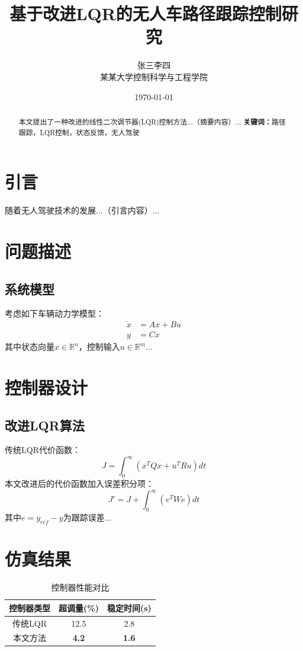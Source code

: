\documentclass[a4paper,10pt,twocolumn]{article}
\title{基于改进LQR的无人车路径跟踪控制研究}
\author{张三\quad 李四\\
        某某大学控制科学与工程学院}
\date{\today}
\begin{document}
\maketitle  %

\begin{abstract}
本文提出了一种改进的线性二次调节器(LQR)控制方法...（摘要内容）...
\textbf{关键词：}路径跟踪，LQR控制，状态反馈，无人驾驶
\end{abstract}

\section{引言}
随着无人驾驶技术的发展...（引言内容）...

\section{问题描述}
\subsection{系统模型}
考虑如下车辆动力学模型：
\begin{align}  %
\dot{x} &= A x + B u \label{eq:state} \\  %
y &= C x
\end{align}
其中状态向量$x \in \mathbb{R}^n$，控制输入$u \in \mathbb{R}^m$...

\section{控制器设计}
\subsection{改进LQR算法}
传统LQR代价函数：
\begin{equation}
J = \int_0^\infty (x^T Q x + u^T R u) dt \label{eq:cost}
\end{equation}
本文改进后的代价函数加入误差积分项：
\begin{equation}
J' = J + \int_0^\infty (e^T W e) dt
\end{equation}
其中$e = y_{ref} - y$为跟踪误差...

\section{仿真结果}
\begin{table}[H]  %
\caption{控制器性能对比} \label{tab:compare}
\centering
\begin{tabular}{ccc} \toprule
控制器类型 & 超调量(\%) & 稳定时间(s) \\ \midrule
传统LQR & 12.5 & 2.8 \\
本文方法 & \textbf{4.2} & \textbf{1.6} \\ \bottomrule
\end{tabular}
\end{table}
\end{document}
